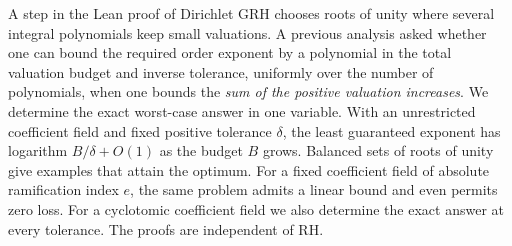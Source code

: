 \documentclass[11pt]{article}
\begin{document}
\noindent
A step in the Lean proof of Dirichlet GRH chooses roots of unity where several integral polynomials keep small valuations. A previous analysis asked whether one can bound the required order exponent by a polynomial in the total valuation budget and inverse tolerance, uniformly over the number of polynomials, when one bounds the \emph{sum of the positive valuation increases}. We determine the exact worst-case answer in one variable. With an unrestricted coefficient field and fixed positive tolerance $\delta$, the least guaranteed exponent has logarithm $B/\delta+O(1)$ as the budget $B$ grows. Balanced sets of roots of unity give examples that attain the optimum. For a fixed coefficient field of absolute ramification index $e$, the same problem admits a linear bound and even permits zero loss. For a cyclotomic coefficient field we also determine the exact answer at every tolerance. The proofs are independent of RH.
\end{document}
